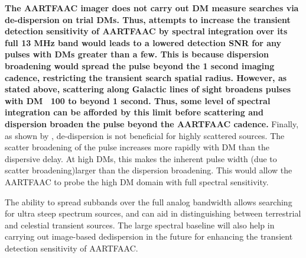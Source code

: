 \documentclass{aa}
\begin{document}

\textbf{The  AARTFAAC  imager  does  not  carry  out  DM  measure  searches  via
  de-dispersion  on  trial  DMs.   Thus,  attempts  to  increase  the  transient
  detection sensitivity of AARTFAAC by spectral integration over its full 13 MHz
  band would  leads to a lowered detection  SNR for any pulses  with DMs greater
  than  a few.  This  is because  dispersion broadening  would spread  the pulse
  beyond the 1 second imaging  cadence, restricting the transient search spatial
  radius. However,  as stated  above, scattering along  Galactic lines  of sight
  broadens pulses with DM ~100 to  beyond 1 second. Thus, some level of spectral
  integration can  be afforded  by this limit  before scattering  and dispersion
  broaden  the  pulse  beyond  the  AARTFAAC cadence.}   Finally,  as  shown  by
\citet{hassall2013detecting},  de-dispersion   is  not  beneficial   for  highly
scattered sources.  The scatter broadening  of the pulse increases  more rapidly
with DM than  the dispersive delay.  At high DMs, this  makes the inherent pulse
width  (due to scatter  broadening)larger than  the dispersion  broadening. This
would  allow  the AARTFAAC  to  probe  the high  DM  domain  with full  spectral
sensitivity.

The ability to  spread subbands over the full  analog bandwidth allows searching
for  ultra  steep  spectrum  sources,  and can  aid  in  distinguishing  between
terrestrial and  celestial transient sources.  The large  spectral baseline will
also help in  carrying out image-based dedispersion in  the future for enhancing
the transient detection sensitivity of AARTFAAC.
\end{document}
